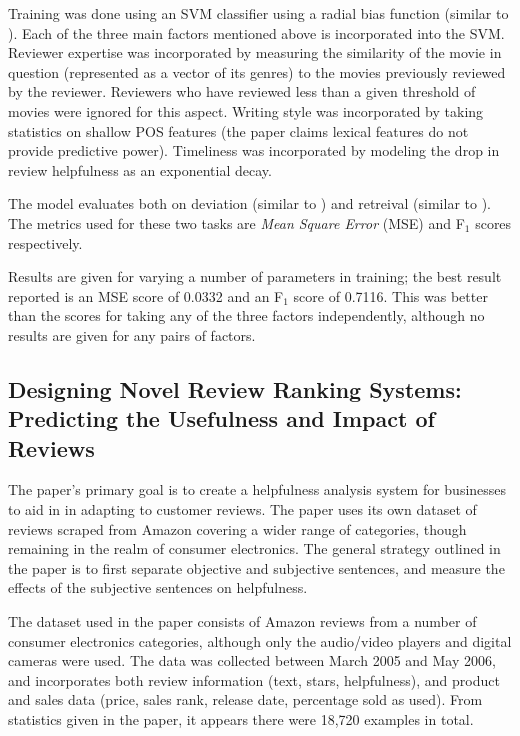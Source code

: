 \documentclass[12pt,letterpaper]{article}
\begin{document}
Training was done using an SVM classifier using a radial bias function (similar to ).
Each of the three main factors mentioned above is incorporated into the SVM. 
Reviewer expertise was incorporated by measuring the similarity of the movie in question (represented as a vector
	of its genres) to the movies previously reviewed by the reviewer.
Reviewers who have reviewed less than a given threshold of movies were ignored for this aspect.
Writing style was incorporated by taking statistics on shallow POS features (the paper claims lexical features
	do not provide predictive power).
Timeliness was incorporated by modeling the drop in review helpfulness as an exponential decay.

The model evaluates both on deviation (similar to ) and retreival (similar
	to ).
The metrics used for these two tasks are {\em Mean Square Error} (MSE) and F$_1$ scores respectively.

Results are given for varying a number of parameters in training; the best result reported is
	an MSE score of 0.0332 and an F$_1$ score of 0.7116.
This was better than the scores for taking any of the three factors independently, although no results
	are given for any pairs of factors.

\subsection{Designing Novel Review Ranking Systems: 
	Predicting the Usefulness and Impact of Reviews \cite{2007ghose-helpfulness}}

The paper's primary goal is to create a helpfulness analysis system 
	for businesses to aid in in adapting to customer reviews.
The paper uses its own dataset of reviews scraped from Amazon covering
	a wider range of categories, though remaining in the realm of consumer electronics.
The general strategy outlined in the paper is to first separate objective and subjective
	sentences, and measure the effects of the subjective sentences on helpfulness.

The dataset used in the paper consists of Amazon reviews from a number of consumer electronics
	categories, although only the audio/video players and digital cameras were used.
The data was collected between March 2005 and May 2006, and incorporates both review information
	(text, stars, helpfulness), and product and sales data (price, sales rank, release date,
	percentage sold as used).
From statistics given in the paper, it appears there were 18,720 examples in total.
\end{document}

